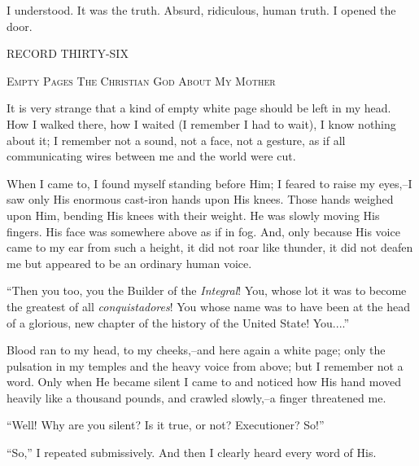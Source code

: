 \documentclass[11pt,openany]{book}
\begin{document}
I understood. It was the truth. Absurd, ridiculous, human truth. I opened the door.

\begin{center}\textsc{RECORD THIRTY-SIX}\end{center}

\begin{center}\textsc{Empty Pages The Christian God About My Mother}\end{center}

It is very strange that a kind of empty white page should be left in my head. How I walked there, how I waited (I remember I had to wait), I know nothing about it; I remember not a sound, not a face, not a gesture, as if all communicating wires between me and the world were cut.

When I came to, I found myself standing before Him; I feared to raise my eyes,--I saw only His enormous cast-iron hands upon His knees. Those hands weighed upon Him, bending His knees with their weight. He was slowly moving His fingers. His face was somewhere above as if in fog. And, only because His voice came to my ear from such a height, it did not roar like thunder, it did not deafen me but appeared to be an ordinary human voice.

``Then you too, you the Builder of the \emph{Integral}! You, whose lot it was to become the greatest of all \emph{conquistadores}! You whose name was to have been at the head of a glorious, new chapter of the history of the United State! You....''

Blood ran to my head, to my cheeks,--and here again a white page; only the pulsation in my temples and the heavy voice from above; but I remember not a word. Only when He became silent I came to and noticed how His hand moved heavily like a thousand pounds, and crawled slowly,--a finger threatened me.

``Well! Why are you silent? Is it true, or not? Executioner? So!''

``So,'' I repeated submissively. And then I clearly heard every word of His.
\end{document}
